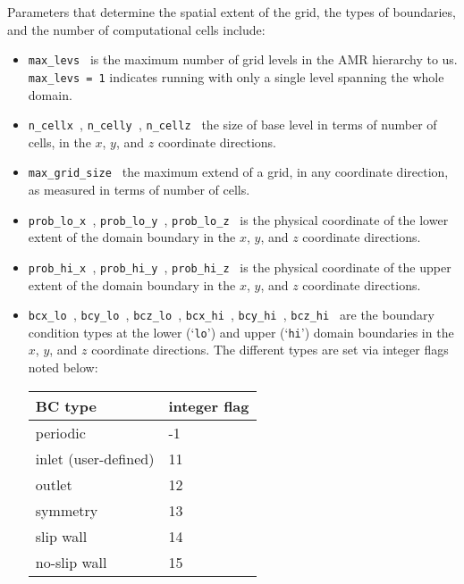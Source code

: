 Parameters that determine the spatial extent of the grid, 
the types of boundaries, and the number of computational cells include:
\begin{itemize}

\item {\tt max\_levs } is the maximum number of grid levels in the AMR
  hierarchy to us.  {\tt max\_levs = 1} indicates running with only a
  single level spanning the whole domain.

\item {\tt n\_cellx }, {\tt n\_celly }, {\tt n\_cellz } the size of
  base level in terms of number of cells, in the $x$, $y$, and $z$
  coordinate directions.

\item {\tt max\_grid\_size } the maximum extend of a grid, in any
  coordinate direction, as measured in terms of number of cells.

\item {\tt prob\_lo\_x }, {\tt prob\_lo\_y }, {\tt prob\_lo\_z } is
  the physical coordinate of the lower extent of the domain boundary
  in the $x$, $y$, and $z$ coordinate directions.

\item {\tt prob\_hi\_x }, {\tt prob\_hi\_y }, {\tt prob\_hi\_z } is
  the physical coordinate of the upper extent of the domain boundary
  in the $x$, $y$, and $z$ coordinate directions.

\item {\tt bcx\_lo }, {\tt bcy\_lo }, {\tt bcz\_lo }, 
      {\tt bcx\_hi }, {\tt bcy\_hi }, {\tt bcz\_hi } are the boundary
   condition types at the lower (`{\tt lo}') and upper (`{\tt hi}')
   domain boundaries in the $x$, $y$, and $z$ coordinate directions.
   The different types are set via integer flags noted below: 

   \begin{center}
   \begin{tabular}{ll}
   \hline
   BC type    & integer flag \\
   \hline
   periodic             & -1 \\
   inlet (user-defined) & 11 \\
   outlet               & 12 \\
   symmetry             & 13 \\
   slip wall            & 14 \\
   no-slip wall         & 15 \\
   \hline
   \end{tabular}
   \end{center}


\end{itemize}

